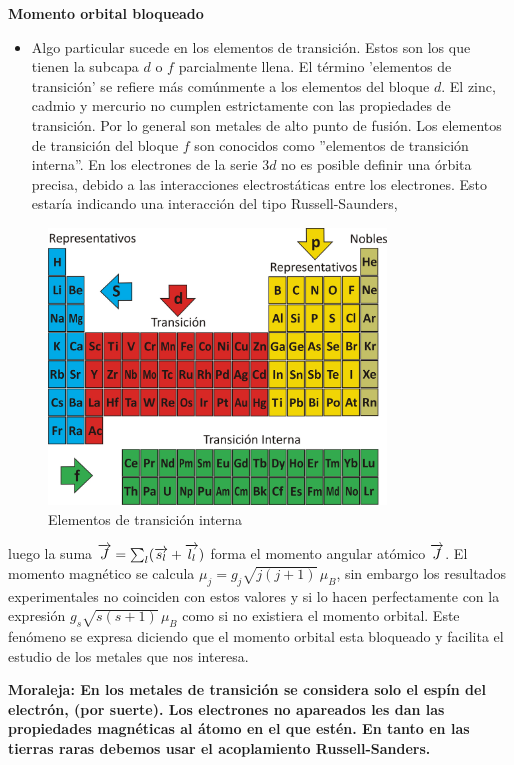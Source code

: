 \textbf{Momento orbital bloqueado}
\begin{itemize}
	\item Algo particular sucede en los
elementos de transición. Estos son los que tienen la subcapa $d$ o $f$ parcialmente llena. El término 'elementos de transición' se refiere más comúnmente a los elementos del bloque $d$. El zinc, cadmio y mercurio no cumplen estrictamente con las propiedades de transición. Por lo general son metales de alto punto de fusión. Los elementos de transición del bloque $f$ son conocidos como ''elementos de transición interna''. En los electrones de la serie $3d$ no es posible definir una órbita precisa, debido a las interacciones electrostáticas entre los electrones. Esto estaría indicando una interacción del tipo Russell-Saunders,
\end{itemize}
 
 
\begin{figure}[H]
    \centering
    \includegraphics[width=0.8\textwidth]{./Figures/TablaPeriodica}
	\caption{Elementos de transición interna}
	\label{fig:TablaPeriodica}
\end{figure}

luego la suma $\overrightarrow{J}=\sum_{l}(\overrightarrow{s_{l}}+\overrightarrow{l_{l}})$ forma el momento angular atómico $\overrightarrow{J}$. El momento magnético se calcula $\mu_{j} = g_{j}\sqrt{j(j+1)}\,\mu_B$, sin embargo los resultados experimentales no coinciden con estos
valores y si lo hacen perfectamente con la expresión $g_{s}\sqrt{s(s+1)}\,\mu_B$ como si no existiera el momento orbital. Este fenómeno se expresa diciendo que el momento orbital esta bloqueado y facilita el estudio de los metales que nos interesa.

\textbf{Moraleja: En los metales de transición se considera solo el espín del electrón, (por suerte). Los electrones no apareados les dan las propiedades magnéticas al átomo en el que estén. En tanto en las tierras raras debemos usar el acoplamiento Russell-Sanders.}


